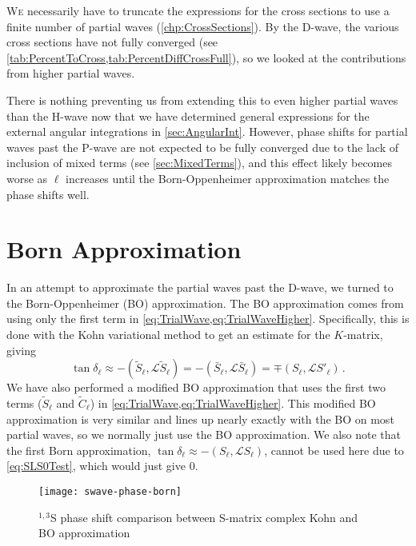 \documentclass[Dissertation.tex]{subfiles}
\begin{document}
\lettrine{\textcolor{startcolor}{W}}{e}
necessarily have to truncate the expressions for the cross
sections to use a finite number of partial waves (\cref{chp:CrossSections}).
By the D-wave, the various cross sections have not
fully converged (see \cref{tab:PercentToCross,tab:PercentDiffCrossFull}), so 
we looked at the contributions from higher partial waves.

There is nothing preventing us from extending this to even higher partial 
waves than the H-wave now that we have determined general expressions for the 
external angular integrations in \cref{sec:AngularInt}. However, phase shifts 
for partial waves past the P-wave are not expected to be fully converged due 
to the lack of inclusion of mixed terms (see \cref{sec:MixedTerms}), and this 
effect likely becomes worse as $\ell$ increases until the Born-Oppenheimer 
approximation matches the phase shifts well.


\section{Born Approximation}
\label{sec:Born}
In an attempt to approximate the partial waves past the D-wave, we turned to 
the Born-Oppenheimer (BO) approximation. The BO approximation comes from using only the 
first term in \cref{eq:TrialWave,eq:TrialWaveHigher}. Specifically, this is 
done with the Kohn variational method to get an estimate for the $K$-matrix, 
giving \cite[p.590]{Bransden2003}
\begin{equation}
\label{eq:Born}
\tan\delta_\ell \approx -(\widetilde{S}_\ell,\mathcal{L}\widetilde{S}_\ell ) = -(\bar{S}_\ell,\mathcal{L}\bar{S}_\ell ) = \mp(S_\ell,\mathcal{L}S'_\ell ) \,.
\end{equation}
We have also performed a modified BO approximation that uses the first two 
terms ($\widetilde{S}_\ell$ and $\widetilde{C}_\ell$) in \cref{eq:TrialWave,eq:TrialWaveHigher}.
This modified BO approximation is very similar and lines up nearly exactly 
with the BO on most partial waves, so we normally just use the BO
approximation. We also note that the first Born approximation,
$\tan\delta_\ell \approx -(S_\ell,\mathcal{L}S_\ell )$, cannot be used
here due to \cref{eq:SLS0Test}, which would just give 0.

\begin{figure}
	\centering
	\texttt{[image: swave-phase-born]}
	\caption[$^{1,3}$S complex Kohn and Born comparison]{$^{1,3}$S phase shift comparison between S-matrix complex Kohn and BO approximation}
	\label{fig:SWavePhaseBorn}
\end{figure}
\end{document}
